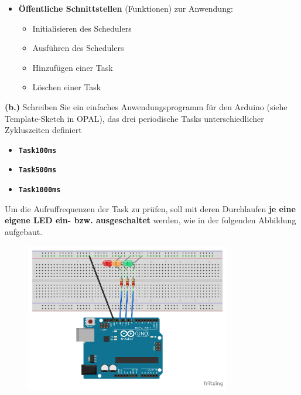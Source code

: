 \documentclass[
    fontsize=12pt,                      %
    paper=a4,                           %
    twoside=off,                       %
    DIV=15,                             %
    BCOR=12mm,                          %
    headings=normal,                    %
    headsepline=false,                   %
    footsepline=false,                  %
    headinclude=true,                   %
    footinclude=false,                  %
    toc=listof,                         %
    toc=bib,                            %
    chapterprefix=false,                %
    appendixprefix=false,               %
    numbers=noendperiod,                %
    captions=tableabove,                %
    footnotes=multiple,                 %
    bibliography=oldstyle,              %
    draft=false,                        %
]{scrreprt}
\newcommand{\Farbcode}[1]{\texttt{\textbf{\textcolor{myred}{#1}}}}
\begin{document}
\begin{itemize}
\item \textbf{Öffentliche Schnittstellen} (Funktionen) zur Anwendung:
\begin{itemize}
\item Initialisieren des Schedulers 
\item Ausführen des Schedulers
\item Hinzufügen einer Task
\item Löschen einer Task
\end{itemize}

\end{itemize}

\vskip 0.5cm
\noindent\textbf{(b.)}
\vskip 0.2cm
\noindent
Schreiben Sie ein einfaches Anwendungsprogramm für den Arduino (siehe Template-Sketch in OPAL), das drei periodische Tasks unterschiedlicher Zykluszeiten definiert
\begin{itemize}
\item \Farbcode{Task100ms}
\item \Farbcode{Task500ms}
\item \Farbcode{Task1000ms}
\end{itemize}
\noindent
Um die Aufruffrequenzen der Task zu prüfen, soll mit deren Durchlaufen \textbf{je eine eigene LED ein- bzw. ausgeschaltet} werden, wie in der folgenden Abbildung aufgebaut.

\begin{figure}[H]
	\centering
	\includegraphics[width=0.8\textwidth]{Figures/Scheduler_Steckplatine}
\end{figure}
\end{document}
